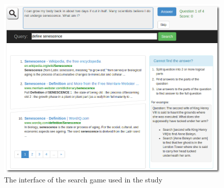 \documentclass{sig-alternate}
\begin{document}
\begin{figure}
\centering
\includegraphics[scale=0.28]{img/ufindit}
\caption{The interface of the search game used in the study}
\label{figure:ufindit}
\end{figure}
\end{document}
